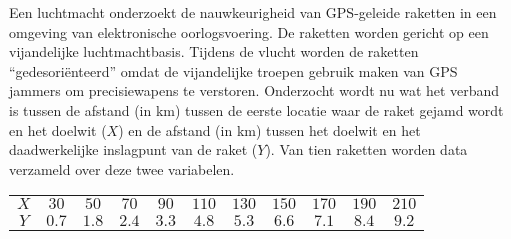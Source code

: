\begin{question}{30}{
    Een luchtmacht onderzoekt de nauwkeurigheid van GPS-geleide raketten in een omgeving van elektronische oorlogsvoering.
    De raketten worden gericht op een vijandelijke luchtmachtbasis.
    Tijdens de vlucht worden de raketten ``gedesori\"enteerd'' omdat de vijandelijke troepen gebruik maken van GPS jammers om precisiewapens te verstoren.
    Onderzocht wordt nu wat het verband is tussen de afstand (in km) tussen de eerste locatie waar de raket gejamd wordt en het doelwit ($X$) en de afstand (in km) tussen het doelwit en het daadwerkelijke inslagpunt van de raket ($Y$).
    Van tien raketten worden data verzameld over deze twee variabelen.
    \begin{center}
        \begin{tabular}{c|cccccccccc}
            \toprule
                \textbf{$X$} & $30$ & $50$  & $70$  & $90$  & $110$  & $130$ & $150$ & $170$ & $190$ & $210$ \\ 
                \textbf{$Y$} & $0.7$ & $1.8$ & $2.4$ & $3.3$ & $4.8$ & $5.3$ & $6.6$ & $7.1$ & $8.4$ & $9.2$ \\
            \bottomrule
        \end{tabular}
    \end{center}
}

    \solution{

    }

    \solution{

    }

    \solution{

    }

    \solution{

    }

    \solution{

    }

\end{question}